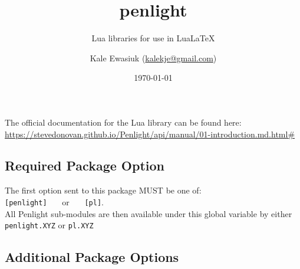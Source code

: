 \documentclass[11pt,parskip=half]{scrartcl}
\author{Kale Ewasiuk (\url{kalekje@gmail.com})}
\date{\today}
\title{penlight}
\subtitle{Lua libraries for use in LuaLaTeX}
\begin{document}
\maketitle

        The official documentation for the Lua library can be found here:\\
  \mbox{\url{https://stevedonovan.github.io/Penlight/api/manual/01-introduction.md.html#}}
    \\

    \subsection*{Required Package Option}
    The first option sent to this package MUST be one of: \\
    \texttt{[penlight]} \ \ \  or \ \ \  \texttt{[pl]}.\\
    All Penlight sub-modules are then available under this global variable by either\\
    \texttt{penlight.XYZ} or \texttt{pl.XYZ}



    \subsection*{Additional Package Options}
\end{document}
